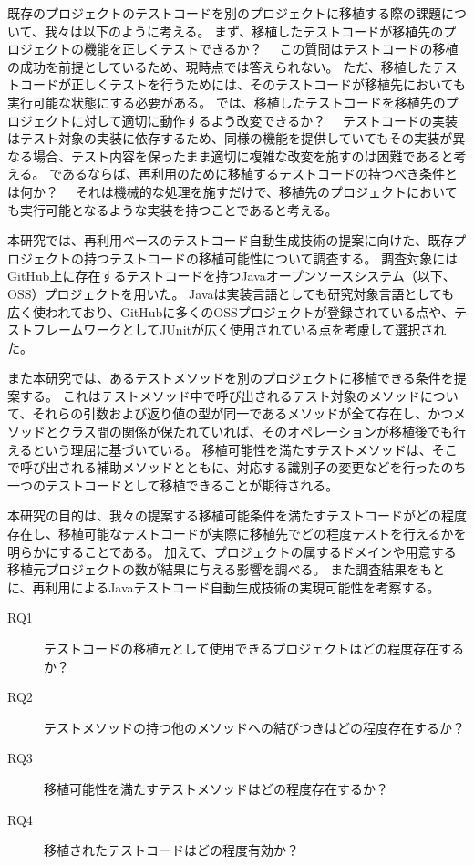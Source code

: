 \documentclass[conference]{IEEEtran}
\begin{document}
既存のプロジェクトのテストコードを別のプロジェクトに移植する際の課題について、我々は以下のように考える。
まず、移植したテストコードが移植先のプロジェクトの機能を正しくテストできるか？　
この質問はテストコードの移植の成功を前提としているため、現時点では答えられない。
ただ、移植したテストコードが正しくテストを行うためには、そのテストコードが移植先においても実行可能な状態にする必要がある。
では、移植したテストコードを移植先のプロジェクトに対して適切に動作するよう改変できるか？　
テストコードの実装はテスト対象の実装に依存するため、同様の機能を提供していてもその実装が異なる場合、テスト内容を保ったまま適切に複雑な改変を施すのは困難であると考える。
であるならば、再利用のために移植するテストコードの持つべき条件とは何か？　
それは機械的な処理を施すだけで、移植先のプロジェクトにおいても実行可能となるような実装を持つことであると考える。

本研究では、再利用ベースのテストコード自動生成技術の提案に向けた、既存プロジェクトの持つテストコードの移植可能性について調査する。
調査対象にはGitHub上に存在するテストコードを持つJavaオープンソースシステム（以下、OSS）プロジェクトを用いた。
Javaは実装言語としても研究対象言語としても広く使われており、GitHubに多くのOSSプロジェクトが登録されている点や、テストフレームワークとしてJUnitが広く使用されている点を考慮して選択された。

また本研究では、あるテストメソッドを別のプロジェクトに移植できる条件を提案する。
これはテストメソッド中で呼び出されるテスト対象のメソッドについて、それらの引数および返り値の型が同一であるメソッドが全て存在し、かつメソッドとクラス間の関係が保たれていれば、そのオペレーションが移植後でも行えるという理屈に基づいている。
移植可能性を満たすテストメソッドは、そこで呼び出される補助メソッドとともに、対応する識別子の変更などを行ったのち一つのテストコードとして移植できることが期待される。

本研究の目的は、我々の提案する移植可能条件を満たすテストコードがどの程度存在し、移植可能なテストコードが実際に移植先でどの程度テストを行えるかを明らかにすることである。
加えて、プロジェクトの属するドメインや用意する移植元プロジェクトの数が結果に与える影響を調べる。
また調査結果をもとに、再利用によるJavaテストコード自動生成技術の実現可能性を考察する。

\begin{description}
\item[RQ1] テストコードの移植元として使用できるプロジェクトはどの程度存在するか？
\item[RQ2] テストメソッドの持つ他のメソッドへの結びつきはどの程度存在するか？
\item[RQ3] 移植可能性を満たすテストメソッドはどの程度存在するか？
\item[RQ4] 移植されたテストコードはどの程度有効か？
\end{description}
\end{document}
